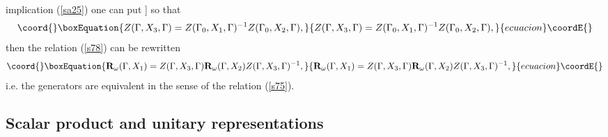 \documentclass[a4paper,a4paper]{article}
\begin{document}
implication (\ref{sa25}) one can put \coordHE{}] so that 
\begin{equation}\coord{}\boxEquation{
Z(\Gamma ,X_{3},\Gamma )=Z(\Gamma _{0},X_{1},\Gamma )^{-1}Z(\Gamma
_{0},X_{2},\Gamma ),  \label{s81}
}{
Z(\Gamma ,X_{3},\Gamma )=Z(\Gamma _{0},X_{1},\Gamma )^{-1}Z(\Gamma
_{0},X_{2},\Gamma ),  }{ecuacion}\coordE{}\end{equation}%
then the relation (\ref{s78}) can be rewritten 
\begin{equation}\coord{}\boxEquation{
\mathbf{R}_{\omega }(\Gamma ,X_{1})=Z(\Gamma ,X_{3},\Gamma )\mathbf{R}
_{\omega }(\Gamma ,X_{2})Z(\Gamma ,X_{3},\Gamma )^{-1},  \label{s82}
}{
\mathbf{R}_{\omega }(\Gamma ,X_{1})=Z(\Gamma ,X_{3},\Gamma )\mathbf{R}
_{\omega }(\Gamma ,X_{2})Z(\Gamma ,X_{3},\Gamma )^{-1},  }{ecuacion}\coordE{}\end{equation}%
i.e. the generators \coordHE{} are equivalent in the sense of the relation (\ref{s75}).

\subsection{Scalar product and unitary representations}
\end{document}
